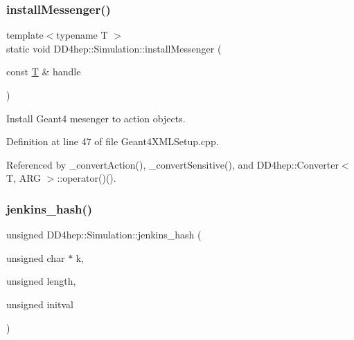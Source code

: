 \hypertarget{namespace_d_d4hep_1_1_simulation_a258276959a44f54280ac69b5a6b74207}{}\label{namespace_d_d4hep_1_1_simulation_a258276959a44f54280ac69b5a6b74207} 
\subsubsection{\texorpdfstring{install\+Messenger()}{installMessenger()}}
{\footnotesize\ttfamily template$<$typename T $>$ \\
static void D\+D4hep\+::\+Simulation\+::install\+Messenger (\begin{DoxyParamCaption}\item[{const \hyperlink{class_t}{T} \&}]{handle }\end{DoxyParamCaption})\hspace{0.3cm}{\ttfamily [static]}}



Install Geant4 mesenger to action objects. 



Definition at line 47 of file Geant4\+X\+M\+L\+Setup.\+cpp.



Referenced by \+\_\+convert\+Action(), \+\_\+convert\+Sensitive(), and D\+D4hep\+::\+Converter$<$ T, A\+R\+G $>$\+::operator()().

\hypertarget{namespace_d_d4hep_1_1_simulation_a7a70f98f660222ddbf5b8dea8ffd1bb6}{}\label{namespace_d_d4hep_1_1_simulation_a7a70f98f660222ddbf5b8dea8ffd1bb6} 
\subsubsection{\texorpdfstring{jenkins\+\_\+hash()}{jenkins\_hash()}}
{\footnotesize\ttfamily unsigned D\+D4hep\+::\+Simulation\+::jenkins\+\_\+hash (\begin{DoxyParamCaption}\item[{unsigned char $\ast$}]{k,  }\item[{unsigned}]{length,  }\item[{unsigned}]{initval }\end{DoxyParamCaption})}



